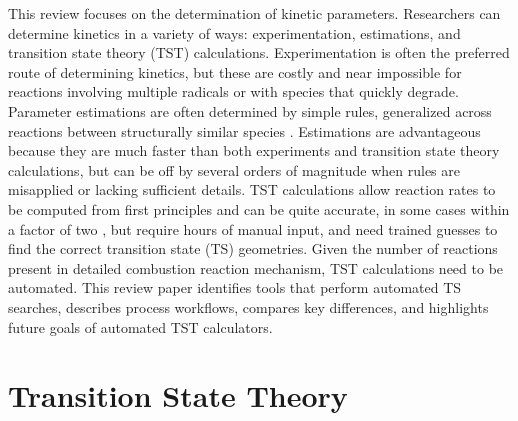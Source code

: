 \documentclass[preprint, 11pt]{elsarticle} %
\begin{document}

This review focuses on the determination of kinetic parameters.
Researchers can determine kinetics in a variety of ways: experimentation, estimations, and transition state theory (TST) calculations.
Experimentation is often the preferred route of determining kinetics, but these are costly and near impossible for reactions involving multiple radicals or with species that quickly degrade.
Parameter estimations are often determined by simple rules, generalized across reactions between structurally similar species \cite{Curran:1998bx}. 
Estimations are advantageous because they are much faster than both experiments and transition state theory calculations, but can be off by several orders of magnitude when rules are misapplied or lacking sufficient details. 
TST calculations allow reaction rates to be computed from first principles and can be quite accurate, in some cases within a factor of two \cite{Klippenstein:2017eu}, but require hours of manual input, and need trained guesses to find the correct transition state (TS) geometries. 
Given the number of reactions present in detailed combustion reaction mechanism, TST calculations need to be automated.
This review paper identifies tools that perform automated TS searches, describes process workflows, compares key differences, and highlights future goals of automated TST calculators.


\section{Transition State Theory}
\end{document}
